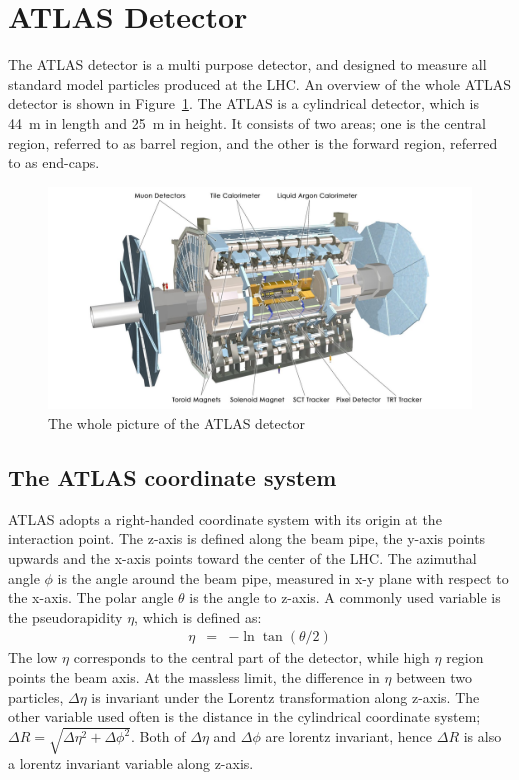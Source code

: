 \section{ATLAS Detector}
\label{sec:detector}
The ATLAS detector is a multi purpose detector, and designed to measure all standard model particles produced at the LHC.
An overview of the whole ATLAS detector is shown in Figure~\ref{fig:ATLAS}.
The ATLAS is a cylindrical detector, which is 44~m in length and 25~m in height. It consists of two areas; one is the central region, referred to as barrel region, and the other is the forward region, referred to as end-caps.
\begin{figure}[tbp]
\begin{center}
 \includegraphics[width=1.0\textwidth,keepaspectratio]{figures/detector/ATLAS}
\caption{
The whole picture of the ATLAS detector
}
\label{fig:ATLAS}
\end{center}
\end{figure}

\subsection{The ATLAS coordinate system}
ATLAS adopts a right-handed coordinate system with its origin at the interaction point. The z-axis is defined along the beam pipe, the y-axis points upwards and the x-axis points toward the center of the LHC. The azimuthal angle $\phi$ is the angle around the beam pipe, measured in x-y plane with respect to the x-axis. The polar angle $\theta$ is the angle to z-axis. A commonly used variable is the pseudorapidity $\eta$, which is defined as:
\begin{eqnarray*}
\eta &=& -\ln\tan(\theta/2)
\end{eqnarray*}
The low $\eta$ corresponds to the central part of the detector, while high $\eta$ region points the beam axis. At the massless limit, the difference in $\eta$ between two particles, $\Delta\eta$ is invariant under the Lorentz transformation along z-axis.
The other variable used often is the distance in the cylindrical coordinate system;
$
\Delta R = \sqrt{\Delta \eta^2 + \Delta \phi^2}
$.
Both of $\Delta \eta$ and $\Delta \phi$ are lorentz invariant, hence $\Delta R$ is also a lorentz invariant variable along z-axis.

